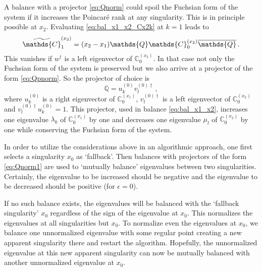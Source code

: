\documentclass[12pt]{article}
\numberwithin{equation}{section}
\numberwithin{figure}{section}
\newcommand{\C}{\mathds{C}}
\newcommand{\Q}{\mathds{Q}}
\newcommand{\Qbar}{\overline\Q}
\begin{document}
        A balance with a projector \eqref{eq:Qnorm} could spoil the Fuchsian form of the system if it increases the Poincar\'{e} rank at any singularity.
        This is in principle possible at $x_2$.
        Evaluating \eqref{eq:bal_x1_x2_Cx2k} at $k=1$ leads to
        \[
          \widetilde \C^{(x_2)}_1 =
          (x_2-x_1)
          \Q \C^{(x_2)}_0 \Qbar\,.
        \]
        This vanishes if $w^\dagger$ is a left eigenvector of $\C^{(x_2)}_0$.
        In that case not only the Fuchsian form of the system is preserved but we also arrive at a projector of the form \eqref{eq:Qpnorm}.
				So the projector of choice is 	
        \begin{equation} \label{eq:Qnorm1}
          \Q = u^{(0)}_k v^{(0)\dagger}_l\,,
        \end{equation}
				where $u^{(0)}_k$ is a right eigenvector of $\C^{(x_1)}_0$, $v^{(0)\dagger}_l$ is a left eigenvector of $\C^{(x_2)}_0$ and $v^{(0)\dagger}_l u^{(0)}_k = 1$.
				This projector, used in balance \eqref{eq:bal_x1_x2}, increases one eigenvalue $\lambda_k$ of $\C^{(x_1)}_0$ by one and decreases one eigenvalue $\mu_l$ of $\C^{(x_2)}_0$ by one while conserving the Fuchsian form of the system.

 			  In order to utilize the considerations above in an algorithmic approach, one first selects a singularity $x_0$ as `fallback'.
        Then balances with projectors of the form \eqref{eq:Qnorm1} are used to `mutually balance' eigenvalues between two singularities. 
        Certainly, the eigenvalue to be increased should be negative and the eigenvalue to be decreased should be positive (for $\epsilon=0$).

        If no such balance exists, the eigenvalues will be balanced with the `fallback singularity' $x_0$ regardless of the sign of the eigenvalue at $x_0$.
        This normalizes the eigenvalues at all singularities but $x_0$.
        To normalize even the eigenvalues at $x_0$, we balance one unnormalized eigenvalue with some regular point creating a new apparent singularity there and restart the algorithm.
        Hopefully, the unnormalized eigenvalue at this new apparent singularity can now be mutually balanced with another unnormalized eigenvalue at $x_0$.
\end{document}
